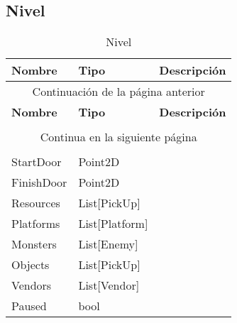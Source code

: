\subsection{Nivel}

\begin{longtable}[H]{
    @{}
    l
    l
    l
    @{}
    }%

    \toprule        %
    \textbf{Nombre} & \textbf{Tipo} & \textbf{Descripción} \\      %
    \midrule        %
    \endfirsthead   %

    \multicolumn{3}{c}{Continuación de la página anterior}\\
    \toprule
    \textbf{Nombre} & \textbf{Tipo} & \textbf{Descripción} \\\\      %
    \midrule        %
    \endhead        %

    \midrule
    \multicolumn{3}{c}{Continua en la siguiente página}\\ %
    \endfoot        %

    \bottomrule
    \caption{Nivel \label{tab:entidad_nivel}} \\
    \endlastfoot    %

    StartDoor       & Point2D           & \\
    FinishDoor      & Point2D           & \\
    Resources       & List[PickUp]      & \\
    Platforms       & List[Platform]    & \\
    Monsters        & List[Enemy]       & \\
    Objects         & List[PickUp]      & \\
    Vendors         & List[Vendor]      & \\
    Paused          & bool              & \\
\end{longtable}